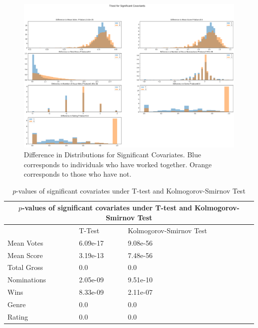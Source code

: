\documentclass{article}
\begin{document}
\begin{figure}
    \centering
    \includegraphics[scale=0.35]{T-test_for_Significant_Covariants.png}
    \caption{Difference in Distributions for Significant Covariates. Blue corresponds to individuals who have worked together. Orange corresponds to those who have not.}
    \label{fig:t-test-fig}
\end{figure}

\bigskip
\begin{table}
  \centering
\begin{tabular}{ |p{7cm}||p{4cm}|p{4cm}| }

 \hline
 \multicolumn{3}{|c|}{$p$-values of significant covariates under T-test and Kolmogorov-Smirnov Test} \\
 \hline
        & T-Test & Kolmogorov-Smirnov Test \\
 \hline
Mean Votes &  6.09e-17     &  9.08e-56  \\
Mean Score  &  3.19e-13   &   7.48e-56   \\
Total Gross &  0.0   &  0.0   \\
Nominations &  2.05e-09   & 9.51e-10    \\
Wins &  8.33e-09   & 2.11e-07   \\
Genre &  0.0  & 0.0   \\
Rating & 0.0  & 0.0   \\
 \hline
\end{tabular} 
\newline\newline
  \caption{$p$-values of significant covariates under T-test and Kolmogorov-Smirnov Test}\label{tab1}
\end{table}
\end{document}

